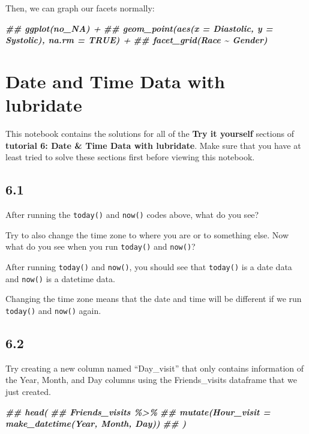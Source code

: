 \documentclass[
]{book}
\newenvironment{Shaded}{\begin{snugshade}}{\end{snugshade}}
\newcommand{\DocumentationTok}[1]{\textcolor[rgb]{0.56,0.35,0.01}{\textbf{\textit{#1}}}}
\begin{document}
Then, we can graph our facets normally:

\begin{Shaded}
\begin{Highlighting}[]
\DocumentationTok{\#\# ggplot(no\_NA) +}
\DocumentationTok{\#\#   geom\_point(aes(x = Diastolic, y = Systolic), na.rm = TRUE) +}
\DocumentationTok{\#\#   facet\_grid(Race \textasciitilde{} Gender)}
\end{Highlighting}
\end{Shaded}

\hypertarget{date-and-time-data-with-lubridate}{%
\section{Date and Time Data with lubridate}\label{date-and-time-data-with-lubridate}}

This notebook contains the solutions for all of the \textbf{Try it yourself} sections of \textbf{tutorial 6: Date \& Time Data with lubridate}. Make sure that you have at least tried to solve these sections first before viewing this notebook.

\hypertarget{section-32}{%
\subsection{6.1}\label{section-32}}

After running the \texttt{today()} and \texttt{now()} codes above, what do you see?

Try to also change the time zone to where you are or to something else. Now what do you see when you run \texttt{today()} and \texttt{now()}?

After running \texttt{today()} and \texttt{now()}, you should see that \texttt{today()} is a date data and \texttt{now()} is a datetime data.

Changing the time zone means that the date and time will be different if we run \texttt{today()} and \texttt{now()} again.

\hypertarget{section-33}{%
\subsection{6.2}\label{section-33}}

Try creating a new column named ``Day\_visit'' that only contains information of the Year, Month, and Day columns using the Friends\_visits dataframe that we just created.

\begin{Shaded}
\begin{Highlighting}[]
\DocumentationTok{\#\# head(}
\DocumentationTok{\#\#   Friends\_visits \%\textgreater{}\% }
\DocumentationTok{\#\#   mutate(Hour\_visit = make\_datetime(Year, Month, Day))}
\DocumentationTok{\#\#    )}
\end{Highlighting}
\end{Shaded}
\end{document}
